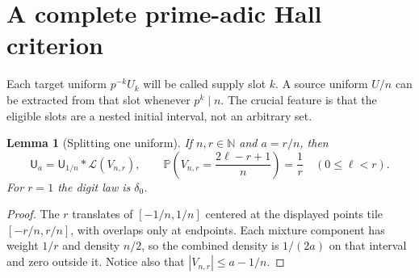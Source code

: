 \documentclass[11pt,a4paper]{article}
\newtheorem{lemma}[theorem]{Lemma}
\theoremstyle{remark}
\newcommand{\N}{\mathbb N}
\newcommand{\Prob}{\mathbb P}
\newcommand{\Law}{\mathcal L}
\newcommand{\Unif}{\mathsf U}
\begin{document}
\section{A complete prime-adic Hall criterion}
\label{sec:hall}

Each target uniform $p^{-k}U_k$ will be called supply slot $k$. A source uniform
$U/n$ can be extracted from that slot whenever $p^k\mid n$. The crucial feature
is that the eligible slots are a nested initial interval, not an arbitrary set.

\begin{lemma}[Splitting one uniform]
\label{lem:split}
If $n,r\in\N$ and $a=r/n$, then
\begin{equation}
 \Unif_a=\Unif_{1/n}*\Law(V_{n,r}),\qquad
 \Prob\left(V_{n,r}=\frac{2\ell-r+1}{n}\right)=\frac1r
 \quad(0\le\ell<r).
 \label{eq:split}
\end{equation}
For $r=1$ the digit law is $\delta_0$.
\end{lemma}
\begin{proof}
The $r$ translates of $[-1/n,1/n]$ centered at the displayed points tile
$[-r/n,r/n]$, with overlaps only at endpoints. Each mixture component has
weight $1/r$ and density $n/2$, so the combined density is $1/(2a)$ on that
interval and zero outside it. Notice also that $|V_{n,r}|\le a-1/n$.
\end{proof}
\end{document}
